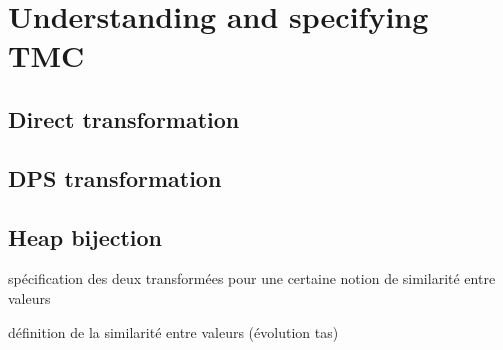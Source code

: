 \section{Understanding and specifying TMC}
\label{sec:specification}

\subsection{Direct transformation}

\subsection{DPS transformation}


\subsection{Heap bijection}



spécification des deux transformées pour une certaine notion de similarité entre valeurs

définition de la similarité entre valeurs (évolution tas)


%


